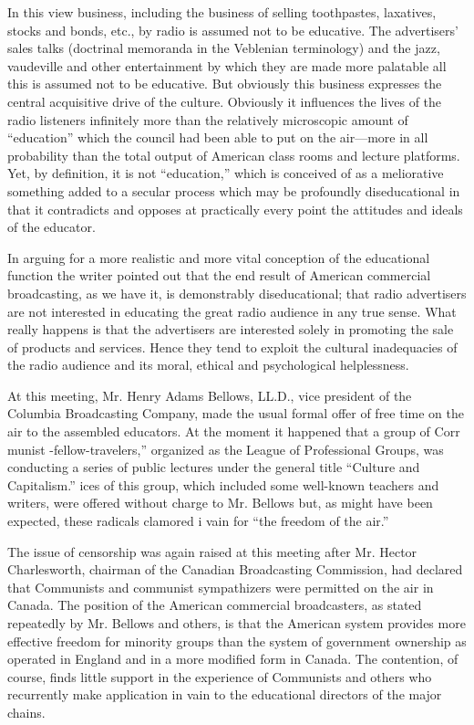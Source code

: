 In this view business, including the business of selling toothpastes,
laxatives, stocks and bonds, etc., by radio is assumed not to be
educative. The advertisers' sales talks (doctrinal memoranda in the
Veblenian terminology) and the jazz, vaudeville and other entertainment
by which they are made more palatable all this is assumed not to be
educative. But obviously this business expresses the central acquisitive
drive of the culture. Obviously it influences the lives of the radio
listeners infinitely more than the relatively microscopic amount of
``education'' which the council had been able to put on the air---more
in all probability than the total output of American class rooms and
lecture platforms. Yet, by definition, it is not ``education,'' which is
conceived of as a meliorative something added to a secular process which
may be profoundly diseducational in that it contradicts and opposes at
practically every point the attitudes and ideals of the educator.

In arguing for a more realistic and more vital conception of the
educational function the writer pointed out that the end result of
American commercial broadcasting, as we have it, is demonstrably
diseducational; that radio advertisers are not interested in educating
the great radio audience in any true sense. What really happens is that
the advertisers are interested solely in promoting the sale of products
and services. Hence they tend to exploit the cultural inadequacies of
the radio audience and its moral, ethical and psychological
helplessness.

At this meeting, Mr. Henry Adams Bellows, LL.D., vice president of the
Columbia Broadcasting Company, made the usual formal offer of free time
on the air to the assembled educators. At the moment it happened that a
group of Corr munist -fellow-travelers,'' organized as the League of
Professional Groups, was conducting a series of public lectures under
the general title ``Culture and Capitalism.'' ices of this group, which
included some well-known teachers and writers, were offered without
charge to Mr. Bellows but, as might have been expected, these radicals
clamored i vain for ``the freedom of the air.''

The issue of censorship was again raised at this meeting after Mr.
Hector Charlesworth, chairman of the Canadian Broadcasting Commission,
had declared that Communists and communist sympathizers were permitted
on the air in Canada. The position of the American commercial
broadcasters, as stated repeatedly by Mr. Bellows and others, is that
the American system provides more effective freedom for minority groups
than the system of government ownership as operated in England and in a
more modified form in Canada. The contention, of course, finds little
support in the experience of Communists and others who recurrently make
application in vain to the educational directors of the major chains.

